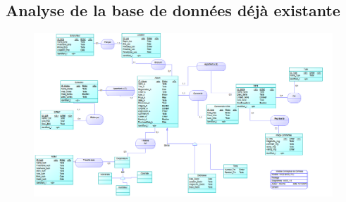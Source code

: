 \subsection{Analyse de la base de données déjà existante}
\begin{figure}[h]
 \centering
 \includegraphics[width=19cm]{MCD_Royal.png}
\end{figure}
